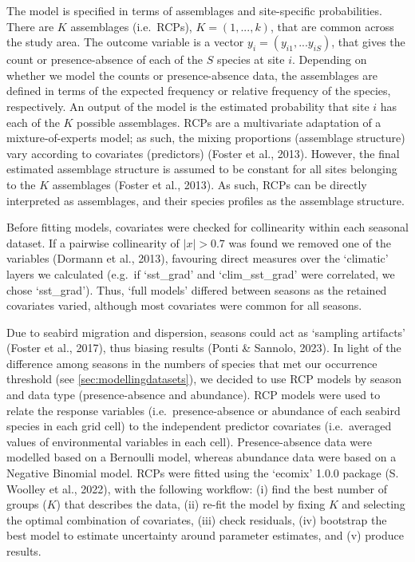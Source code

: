 \documentclass{article}
\begin{document}
\begin{linenumbers}
The model is specified in terms of assemblages and site-specific probabilities. There are \(K\) assemblages (i.e.~RCPs), \(K = (1, ..., k)\), that are common across the study area. The outcome variable is a vector \(y_{i} = (y_{i1}, ... y_{iS})\), that gives the count or presence-absence of each of the \(S\) species at site \(i\). Depending on whether we model the counts or presence-absence data, the assemblages are defined in terms of the expected frequency or relative frequency of the species, respectively. An output of the model is the estimated probability that site \(i\) has each of the \(K\) possible assemblages. RCPs are a multivariate adaptation of a mixture-of-experts model; as such, the mixing proportions (assemblage structure) vary according to covariates (predictors) (Foster et al., 2013). However, the final estimated assemblage structure is assumed to be constant for all sites belonging to the \(K\) assemblages (Foster et al., 2013). As such, RCPs can be directly interpreted as assemblages, and their species profiles as the assemblage structure.

Before fitting models, covariates were checked for collinearity within each seasonal dataset. If a pairwise collinearity of \(\left|x\right| >0.7\) was found we removed one of the variables (Dormann et al., 2013), favouring direct measures over the `climatic' layers we calculated (e.g.~if `sst\_grad' and `clim\_sst\_grad' were correlated, we chose `sst\_grad'). Thus, `full models' differed between seasons as the retained covariates varied, although most covariates were common for all seasons.

Due to seabird migration and dispersion, seasons could act as `sampling artifacts' (Foster et al., 2017), thus biasing results (Ponti \& Sannolo, 2023). In light of the difference among seasons in the numbers of species that met our occurrence threshold (see \ref{sec:modellingdatasets}), we decided to use RCP models by season and data type (presence-absence and abundance). RCP models were used to relate the response variables (i.e.~presence-absence or abundance of each seabird species in each grid cell) to the independent predictor covariates (i.e.~averaged values of environmental variables in each cell). Presence-absence data were modelled based on a Bernoulli model, whereas abundance data were based on a Negative Binomial model. RCPs were fitted using the `ecomix' 1.0.0 package (S. Woolley et al., 2022), with the following workflow: (i) find the best number of groups (\(K\)) that describes the data, (ii) re-fit the model by fixing \(K\) and selecting the optimal combination of covariates, (iii) check residuals, (iv) bootstrap the best model to estimate uncertainty around parameter estimates, and (v) produce results.


\end{linenumbers}
\end{document}
